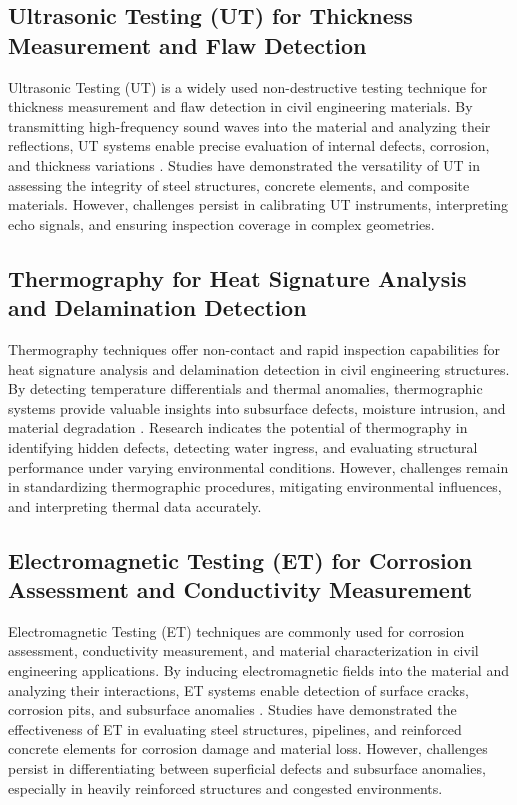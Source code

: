 \documentclass[journal, a4paper]{IEEEtran}
\begin{document}
\subsection{Ultrasonic Testing (UT) for Thickness Measurement and Flaw Detection}
Ultrasonic Testing (UT) is a widely used non-destructive testing technique for thickness measurement
and flaw detection in civil engineering materials. By transmitting high-frequency sound waves into the
material and analyzing their reflections, UT systems enable precise evaluation of internal defects,
corrosion, and thickness variations \cite{lambinet_measurement_2022} \cite{zhang_spatial_2023} \cite{li_physics-informed_2023}.
Studies have demonstrated the versatility of UT
in assessing the integrity of steel structures, concrete elements, and composite materials.
However, challenges persist in calibrating UT instruments, interpreting echo signals, and ensuring inspection coverage
in complex geometries. 

\subsection{Thermography for Heat Signature Analysis and Delamination Detection}
Thermography techniques offer non-contact and rapid inspection capabilities for heat
signature analysis and delamination detection in civil engineering structures.
By detecting temperature differentials and thermal anomalies, thermographic systems provide valuable
insights into subsurface defects, moisture intrusion, and material degradation
\cite{rehman_advancing_2024} \cite{parida_comparative_2023} \cite{wu_internal_2024}.
Research indicates the potential of thermography in identifying hidden defects, detecting water ingress,
and evaluating structural performance under varying environmental conditions.
However, challenges remain in standardizing thermographic procedures, mitigating environmental influences,
and interpreting thermal data accurately. 

\subsection{Electromagnetic Testing (ET) for Corrosion Assessment and Conductivity Measurement}
Electromagnetic Testing (ET) techniques are commonly used for corrosion assessment, conductivity measurement,
and material characterization in civil engineering applications. By inducing electromagnetic fields into the material
and analyzing their interactions, ET systems enable detection of surface cracks, corrosion pits, and subsurface anomalies
\cite{carani_impact_2022} \cite{rufai_cure_2020} \cite{meng_effects_2021}. Studies have demonstrated the effectiveness of ET in evaluating steel structures, pipelines, and reinforced
concrete elements for corrosion damage and material loss. However, challenges persist in differentiating between superficial
defects and subsurface anomalies, especially in heavily reinforced structures and congested environments.
\end{document}
